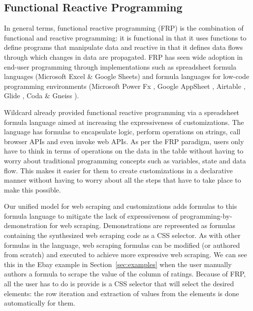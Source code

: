 \documentclass[sigconf,10pt]{acmart}
\begin{document}
\hypertarget{functional-reactive-programming}{%
\subsection{Functional Reactive
Programming}\label{functional-reactive-programming}}

In general terms, functional reactive programming (FRP) is the
combination of functional and reactive programming: it is functional in
that it uses functions to define programs that manipulate data and
reactive in that it defines data flows through which changes in data are
propagated. FRP has seen wide adoption in end-user programming through
implementations such as spreadsheet formula languages (Microsoft Excel
\& Google Sheets) and formula languages for low-code programming
environments (Microsoft Power Fx \citep{zotero-150}, Google AppSheet
\citep{zotero-218}, Airtable \citep{zotero-228}, Glide
\citep{zotero-148}, Coda \citep{zotero-155} \& Gneiss
\citep{chang2014}).

Wildcard \citep{litt2020, litt2020b} already provided functional
reactive programming via a spreadsheet formula language aimed at
increasing the expressiveness of customizations. The language has
formulas to encapsulate logic, perform operations on strings, call
browser APIs and even invoke web APIs. As per the FRP paradigm, users
only have to think in terms of operations on the data in the table
without having to worry about traditional programming concepts such as
variables, state and data flow. This makes it easier for them to create
customizations in a declarative manner without having to worry about all
the steps that have to take place to make this possible.

Our unified model for web scraping and customizations adds formulas to
this formula language to mitigate the lack of expressiveness of
programming-by-demonstration for web scraping. Demonstrations are
represented as formulas containing the synthesized web scraping code as
a CSS selector. As with other formulas in the language, web scraping
formulas can be modified (or authored from scratch) and executed to
achieve more expressive web scraping. We can see this in the Ebay
example in Section~\ref{sec:examples} when the user manually authors a
formula to scrape the value of the column of ratings. Because of FRP,
all the user has to do is provide is a CSS selector that will select the
desired elements: the row iteration and extraction of values from the
elements is done automatically for them.
\end{document}
